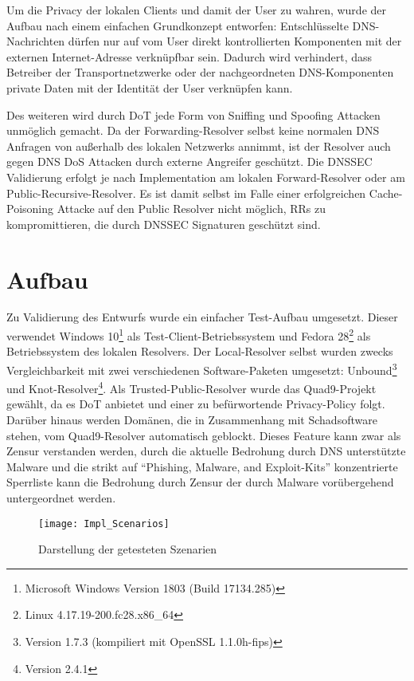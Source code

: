 Um die Privacy der lokalen Clients und damit der User zu wahren, wurde der Aufbau nach einem einfachen Grundkonzept entworfen: Entschlüsselte DNS-Nachrichten dürfen nur auf vom User direkt kontrollierten Komponenten mit der externen Internet-Adresse verknüpfbar sein. Dadurch wird verhindert, dass Betreiber der Transportnetzwerke oder der nachgeordneten DNS-Komponenten private Daten mit der Identität der User verknüpfen kann.

Des weiteren wird durch DoT jede Form von Sniffing und Spoofing Attacken unmöglich gemacht. Da der Forwarding-Resolver selbst keine normalen DNS Anfragen von außerhalb des lokalen Netzwerks annimmt, ist der Resolver auch gegen DNS DoS Attacken durch externe Angreifer geschützt. Die \ac{DNSSEC} Validierung erfolgt je nach Implementation am lokalen Forward-Resolver oder am Public-Recursive-Resolver. Es ist damit selbst im Falle einer erfolgreichen Cache-Poisoning Attacke auf den Public Resolver nicht möglich, RRs zu kompromittieren, die durch \ac{DNSSEC} Signaturen geschützt sind.

\section{Aufbau}
\label{sec:architecture}
Zu Validierung des Entwurfs wurde ein einfacher Test-Aufbau umgesetzt. Dieser verwendet Windows 10\footnote{Microsoft Windows Version 1803 (Build 17134.285)} als Test-Client-Betriebssystem und Fedora 28\footnote{Linux 4.17.19-200.fc28.x86\_64} als Betriebssystem des lokalen Resolvers. Der Local-Resolver selbst wurden zwecks Vergleichbarkeit mit zwei verschiedenen Software-Paketen umgesetzt: Unbound\footnote{Version 1.7.3 (kompiliert mit OpenSSL 1.1.0h-fips)} und Knot-Resolver\footnote{Version 2.4.1}. Als Trusted-Public-Resolver wurde das Quad9-Projekt gewählt, da es DoT anbietet und einer zu befürwortende Privacy-Policy\cite{Quad9Privacy} folgt. Darüber hinaus werden Domänen, die in Zusammenhang mit Schadsoftware stehen, vom Quad9-Resolver automatisch geblockt. Dieses Feature kann zwar als Zensur verstanden werden, durch die aktuelle Bedrohung durch DNS unterstützte Malware \cite{Alcoy2017} und die strikt auf ``Phishing, Malware, and Exploit-Kits'' konzentrierte Sperrliste\cite{Quad9FAQ} kann die Bedrohung durch Zensur der durch Malware vorübergehend untergeordnet werden.   
\begin{wrapfigure}{r}{0.5\textwidth}
    \begin{center}
    \texttt{[image: Impl\_Scenarios]}
    \end{center}
    \caption{Darstellung der getesteten Szenarien}
    \label{img:impl-scenarios}
\end{wrapfigure}

